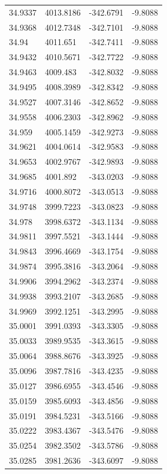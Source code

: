 \begin{table}[H]
\begin{tabular}{llll}
34.9337 & 4013.8186 & -342.6791 & -9.8088 \\
34.9368 & 4012.7348 & -342.7101 & -9.8088 \\
34.94 & 4011.651 & -342.7411 & -9.8088 \\
34.9432 & 4010.5671 & -342.7722 & -9.8088 \\
34.9463 & 4009.483 & -342.8032 & -9.8088 \\
34.9495 & 4008.3989 & -342.8342 & -9.8088 \\
34.9527 & 4007.3146 & -342.8652 & -9.8088 \\
34.9558 & 4006.2303 & -342.8962 & -9.8088 \\
34.959 & 4005.1459 & -342.9273 & -9.8088 \\
34.9621 & 4004.0614 & -342.9583 & -9.8088 \\
34.9653 & 4002.9767 & -342.9893 & -9.8088 \\
34.9685 & 4001.892 & -343.0203 & -9.8088 \\
34.9716 & 4000.8072 & -343.0513 & -9.8088 \\
34.9748 & 3999.7223 & -343.0823 & -9.8088 \\
34.978 & 3998.6372 & -343.1134 & -9.8088 \\
34.9811 & 3997.5521 & -343.1444 & -9.8088 \\
34.9843 & 3996.4669 & -343.1754 & -9.8088 \\
34.9874 & 3995.3816 & -343.2064 & -9.8088 \\
34.9906 & 3994.2962 & -343.2374 & -9.8088 \\
34.9938 & 3993.2107 & -343.2685 & -9.8088 \\
34.9969 & 3992.1251 & -343.2995 & -9.8088 \\
35.0001 & 3991.0393 & -343.3305 & -9.8088 \\
35.0033 & 3989.9535 & -343.3615 & -9.8088 \\
35.0064 & 3988.8676 & -343.3925 & -9.8088 \\
35.0096 & 3987.7816 & -343.4235 & -9.8088 \\
35.0127 & 3986.6955 & -343.4546 & -9.8088 \\
35.0159 & 3985.6093 & -343.4856 & -9.8088 \\
35.0191 & 3984.5231 & -343.5166 & -9.8088 \\
35.0222 & 3983.4367 & -343.5476 & -9.8088 \\
35.0254 & 3982.3502 & -343.5786 & -9.8088 \\
35.0285 & 3981.2636 & -343.6097 & -9.8088 \\

\end{tabular}
\end{table}

